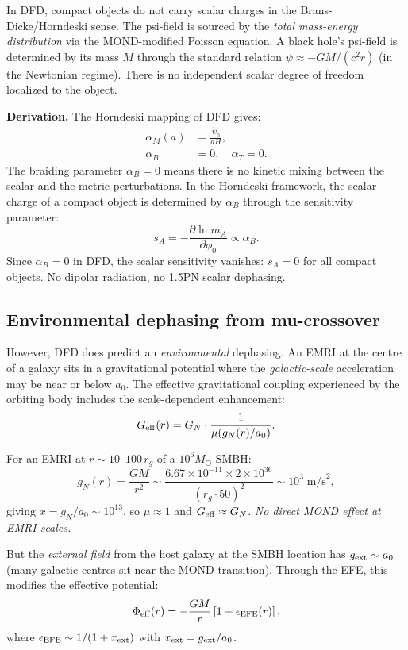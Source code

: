 \documentclass[11pt]{article}
\newcommand{\ee}[1]{\times 10^{#1}}
\newcommand{\mufd}{\mu}
\newcommand{\aM}{a_0}
\newcommand{\Geff}{G_{\rm eff}}
\begin{document}
In DFD, compact objects do not carry scalar charges in the
Brans-Dicke/Horndeski sense. The psi-field is sourced by the
\emph{total mass-energy distribution} via the MOND-modified Poisson
equation. A black hole's psi-field is determined by its mass $M$
through the standard relation $\psi \approx -G M/(c^2 r)$ (in the
Newtonian regime). There is no independent scalar degree of freedom
localized to the object.

\textbf{Derivation.} The Horndeski mapping of DFD gives:
\begin{align}
\alpha_M(a) &= \frac{\dot{\psi}_0}{aH}, \\
\alpha_B &= 0, \quad \alpha_T = 0.
\end{align}
The braiding parameter $\alpha_B = 0$ means there is no kinetic
mixing between the scalar and the metric perturbations. In the
Horndeski framework, the scalar charge of a compact object is
determined by $\alpha_B$ through the sensitivity parameter:
\begin{equation}
s_A = -\frac{\partial \ln m_A}{\partial \phi_0} \propto \alpha_B.
\end{equation}
Since $\alpha_B = 0$ in DFD, the scalar sensitivity vanishes:
$s_A = 0$ for all compact objects. No dipolar radiation, no
1.5PN scalar dephasing.

\subsection{Environmental dephasing from mu-crossover}

However, DFD does predict an \emph{environmental} dephasing. An EMRI
at the centre of a galaxy sits in a gravitational potential where the
\emph{galactic-scale} acceleration may be near or below $\aM$. The
effective gravitational coupling experienced by the orbiting body
includes the scale-dependent enhancement:
\begin{equation}
\Geff(r) = G_N \cdot \frac{1}{\mufd(g_N(r)/\aM)}.
\end{equation}

For an EMRI at $r \sim 10$--$100\,r_g$ of a $10^6 M_\odot$ SMBH:
\begin{equation}
g_N(r) = \frac{GM}{r^2} \sim \frac{6.67\ee{-11} \times 2\ee{36}}
{(r_g \cdot 50)^2} \sim 10^{3}\;\text{m/s}^2,
\end{equation}
giving $x = g_N/\aM \sim 10^{13}$, so $\mufd \approx 1$ and
$\Geff \approx G_N$. \emph{No direct MOND effect at EMRI scales.}

But the \emph{external field} from the host galaxy at the SMBH
location has $g_{\rm ext} \sim \aM$ (many galactic centres sit
near the MOND transition). Through the EFE, this modifies the
effective potential:
\begin{equation}
\Phi_{\rm eff}(r) = -\frac{GM}{r}\left[1 + \epsilon_{\rm EFE}(r)\right],
\end{equation}
where $\epsilon_{\rm EFE} \sim 1/(1 + x_{\rm ext})$ with
$x_{\rm ext} = g_{\rm ext}/\aM$.
\end{document}
